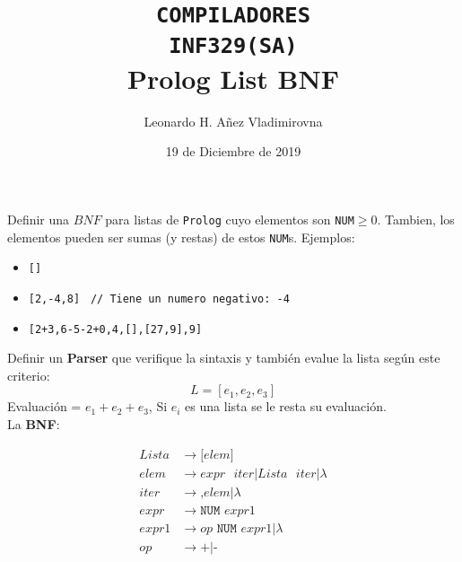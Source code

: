 \documentclass[10pt,letterpaper]{article}
\author{Leonardo H. Añez Vladimirovna}
\title{{\normalsize \texttt{COMPILADORES \\ \vspace{-0.5cm} INF329(SA)}}\\ Prolog List BNF}
\date{19 de Diciembre de 2019}
\newcommand{\cmark}{\ding{51}}%
\newcommand{\xmark}{\ding{55}}%
\begin{document}
\maketitle

Definir una $BNF$ para listas de \texttt{Prolog} cuyo elementos son \texttt{NUM}$\geq 0$. Tambien, los elementos pueden ser sumas (y restas) de estos \texttt{NUM}s. Ejemplos:
\begin{itemize}
\item \texttt{[]} \cmark
\item \texttt{[2,-4,8]} \xmark \texttt{ // Tiene un numero negativo: -4}
\item \texttt{[2+3,6-5-2+0,4,[],[27,9],9] } \cmark
\end{itemize}

Definir un \textbf{Parser} que verifique la sintaxis y también evalue la lista según este criterio:
$$
L = [e_1,e_2,e_3]
$$
\noindent Evaluación = $e_1 + e_2 + e_3$, Si $e_i$ es una lista se le resta su evaluación.
\\ ${ }$ \\
La \textbf{BNF}:
\begin{fminipage}{\textwidth}
\begin{align*}
Lista & \rightarrow \texttt{[} elem \texttt{]} \\
elem & \rightarrow expr \text{ } iter | Lista \text{ } iter | \lambda \\
iter & \rightarrow \texttt{,} elem | \lambda \\
expr & \rightarrow \texttt{NUM } expr1 \\
expr1 & \rightarrow op \texttt{ NUM } expr1 | \lambda \\
op & \rightarrow \texttt{+} | \texttt{-} \\
\end{align*}
\end{fminipage}
\end{document}
